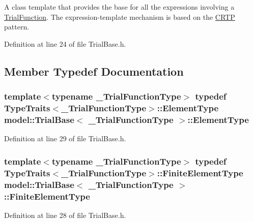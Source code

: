 A class template that provides the base for all the expressions involving a \hyperlink{classmodel_1_1_trial_function}{Trial\+Function}. The expression-\/template mechanism is based on the \hyperlink{classmodel_1_1_c_r_t_p}{C\+R\+T\+P} pattern. 

Definition at line 24 of file Trial\+Base.\+h.



\subsection{Member Typedef Documentation}
\hypertarget{classmodel_1_1_trial_base_a124e38df0c40239e484ce9e4e7f4f688}{}
\subsubsection[{Element\+Type}]{\setlength{\rightskip}{0pt plus 5cm}template$<$typename \+\_\+\+Trial\+Function\+Type$>$ typedef {\bf Type\+Traits}$<$\+\_\+\+Trial\+Function\+Type$>$\+::{\bf Element\+Type} {\bf model\+::\+Trial\+Base}$<$ \+\_\+\+Trial\+Function\+Type $>$\+::{\bf Element\+Type}}\label{classmodel_1_1_trial_base_a124e38df0c40239e484ce9e4e7f4f688}


Definition at line 29 of file Trial\+Base.\+h.

\hypertarget{classmodel_1_1_trial_base_a45e0810798dc561fc2233fdfb9f7fa4b}{}
\subsubsection[{Finite\+Element\+Type}]{\setlength{\rightskip}{0pt plus 5cm}template$<$typename \+\_\+\+Trial\+Function\+Type$>$ typedef {\bf Type\+Traits}$<$\+\_\+\+Trial\+Function\+Type$>$\+::{\bf Finite\+Element\+Type} {\bf model\+::\+Trial\+Base}$<$ \+\_\+\+Trial\+Function\+Type $>$\+::{\bf Finite\+Element\+Type}}\label{classmodel_1_1_trial_base_a45e0810798dc561fc2233fdfb9f7fa4b}


Definition at line 28 of file Trial\+Base.\+h.

\hypertarget{classmodel_1_1_trial_base_a97477f1b794cf8fd2f1eadd4ea88da65}{}

